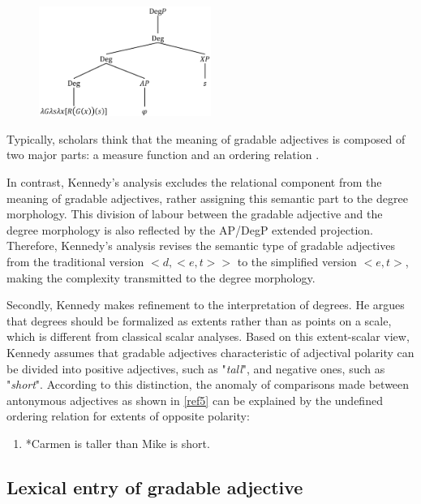 \documentclass{ctexart}
\let \cite \parencite
\begin{document}
\begin{figure}[h]
\centering
\includegraphics[width=0.5\textwidth]{pic/pic1.png}
\end{figure}

Typically, scholars think that the meaning of gradable adjectives is composed of two major parts: a measure function and an ordering relation \cite{carston2013,horn1992}.

In contrast, Kennedy’s analysis excludes the relational component from the meaning of gradable adjectives, rather assigning this semantic part to the degree morphology. This division of labour between the gradable adjective and the degree morphology is also reflected by the AP/DegP extended projection. Therefore, Kennedy’s analysis revises the semantic type of gradable adjectives from the traditional version $<d,<e,t>>$ to the simplified version $<e,t>$, making the complexity transmitted to the degree morphology.

Secondly, Kennedy makes refinement to the interpretation of degrees. He argues that degrees should be formalized as extents\cite{seuren1978,von1984b,bierwisch1989,lobner2010} rather than as points on a scale, which is different from classical scalar analyses. Based on this extent-scalar view, Kennedy assumes that gradable adjectives characteristic of adjectival polarity can be divided into positive adjectives, such as "\textit{tall}", and negative ones, such as "\textit{short}". According to this distinction, the anomaly of comparisons made between antonymous adjectives as shown in \ref{ref5} can be explained by the undefined ordering relation for extents of opposite polarity:

\begin{enumerate}[resume]
\item \label{ref5}
*Carmen is taller than Mike is short.
\end{enumerate}

\subsection{Lexical entry of gradable adjective}
\end{document}
